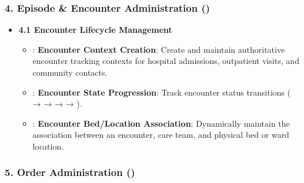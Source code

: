 \subsubsection*{4. Episode \& Encounter Administration (\texttt{})}
\label{rad:enabling:296}

\begin{itemize}

\item 
\textbf{4.1 Encounter Lifecycle Management}


\begin{itemize}

\item 
\texttt{}: \textbf{Encounter Context Creation}: Create and maintain authoritative encounter tracking contexts for hospital admissions, outpatient visits, and community contacts.



\item 
\texttt{}: \textbf{Encounter State Progression}: Track encounter status transitions (\texttt{} → \texttt{} → \texttt{} → \texttt{} → \texttt{}).



\item 
\texttt{}: \textbf{Encounter Bed/\allowbreak{}Location Association}: Dynamically maintain the association between an encounter, care team, and physical bed or ward location.



\end{itemize}


\end{itemize}
\label{rad:enabling:301}
\subsubsection*{5. Order Administration (\texttt{})}
\label{rad:enabling:302}

